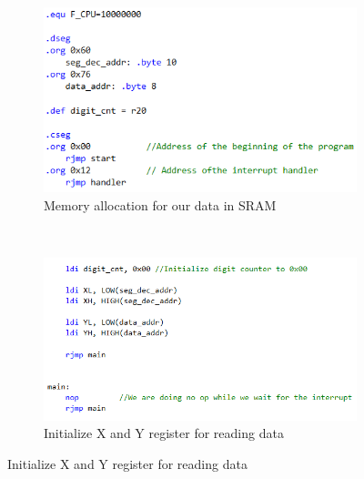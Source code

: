 \documentclass{article}
\begin{document}
\begin{figure}[h!]
		\begin{subfigure}[t]{0.5\textwidth}
			\centering
			\includegraphics[width=\linewidth]{./results/lab2_malloc.png}
			\caption{Memory allocation for our data in SRAM}
		\end{subfigure}%
		~
		\begin{subfigure}[t]{0.5\textwidth}
			\centering
			\includegraphics[width=\linewidth]{./results/lab2_init_main.png}
			\caption{Initialize X and Y register for reading data}
		\end{subfigure}	
	\end{figure}
	
\end{document}
